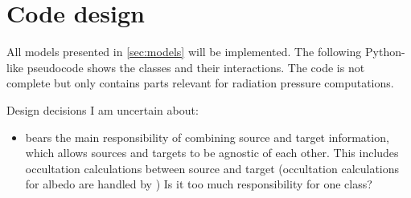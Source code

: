 \documentclass[parskip=full,DIV=15]{scrartcl}
\begin{document}
\section{Code design}
All models presented in \cref{sec:models} will be implemented. The following Python-like pseudocode shows the classes and their interactions. The code is not complete but only contains parts relevant for radiation pressure computations.

Design decisions I am uncertain about:
\begin{itemize}
   \item {} bears the main responsibility of combining source and target information, which allows sources and targets to be agnostic of each other. This includes occultation calculations between source and target (occultation calculations for albedo are handled by ) Is it too much responsibility for one class?
\end{itemize}

\inputminted{python}{code_design.py}
\end{document}
